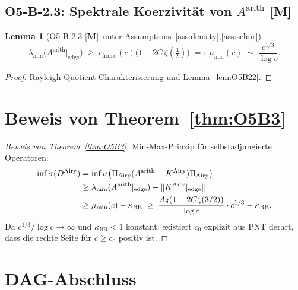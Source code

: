\documentclass[12pt,a4paper]{amsart}
\newcommand{\statusM}{{\color{green!60!black}[\textbf{M}]}}
\newtheorem{lemma}[theorem]{Lemma}
\theoremstyle{definition}
\newcommand{\KAiry}{K^{\mathrm{Airy}}}
\newcommand{\Aarith}{A^{\mathrm{arith}}}
\newcommand{\DAiry}{D^{\mathrm{Airy}}}
\newcommand{\PiAiry}{\Pi_{\mathrm{Airy}}}
\newcommand{\kappaBB}{\kappa_{\mathrm{BB}}}
\newcommand{\cframe}{c_{\mathrm{frame}}}
\newcommand{\norm}[1]{\lVert #1 \rVert}
\begin{document}
\subsection{O5-B-2.3: Spektrale Koerzivität von $\Aarith$ \statusM}
\label{sec:O5B23}

\begin{lemma}[O5-B-2.3 \statusM\ unter Assumptions~\ref{ass:density},\ref{ass:schur}]
\label{lem:O5B23}
\[
  \lambda_{\min}\bigl(\Aarith\big|_{\mathrm{edge}}\bigr)
  \;\ge\;
  \cframe(c)\bigl(1 - 2C\,\zeta\!\left(\tfrac{3}{2}\right)\bigr)
  \;=:\; \mu_{\min}(c)
  \;\sim\; \frac{c^{1/3}}{\log c}.
\]
\end{lemma}

\begin{proof}
Rayleigh-Quotient-Charakterisierung und Lemma~\ref{lem:O5B22}.
\end{proof}

\section{Beweis von Theorem~\ref{thm:O5B3}}
\label{sec:proof}

\begin{proof}[Beweis von Theorem~\ref{thm:O5B3}]
Min-Max-Prinzip für selbstadjungierte Operatoren:
\begin{align}
  \inf\sigma(\DAiry)
  &= \inf\sigma\bigl(\PiAiry(\Aarith - \KAiry)\PiAiry\bigr) \notag\\
  &\ge \lambda_{\min}(\Aarith|_{\mathrm{edge}})
       - \norm{\KAiry|_{\mathrm{edge}}} \notag\\
  &\ge \mu_{\min}(c) - \kappaBB
  \;\ge\; \frac{A_\delta(1-2C\zeta(3/2))}{\log c}\cdot c^{1/3} - \kappaBB.
  \label{eq:hauptsatz}
\end{align}
Da $c^{1/3}/\log c \to \infty$ und $\kappaBB < 1$ konstant:
existiert $c_0$ explizit aus PNT derart, dass die rechte Seite
für $c \ge c_0$ positiv ist.
\end{proof}

\section{DAG-Abschluss}
\label{sec:dag}
\end{document}
